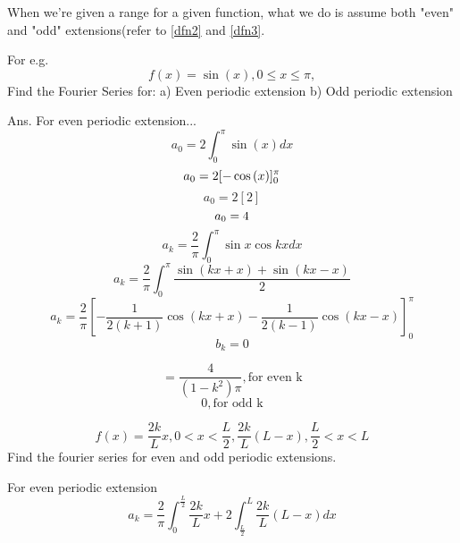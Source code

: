 \documentclass[twoside]{report}
\begin{document}
When we're given a range for a given function, what we do is assume both "even" and "odd" extensions(refer to \ref{dfn2} and \ref{dfn3}.

For e.g.
$$
f(x) = \sin{(x)}, 0\leq x\leq\pi,$$
Find the Fourier Series for:
a) Even periodic extension 
b) Odd periodic extension

Ans.
For even periodic extension...
\begin{displaymath}
    a_0 = 2\int_{0}^{\pi} \sin{(x)}dx    
\end{displaymath}
\begin{displaymath}
    a_0 = 2 [-\cos{(x)}]_0^{\pi} \\
    \end{displaymath}
    \begin{displaymath}
        a_0 = 2 [2]
    \end{displaymath}
    \begin{displaymath}
        a_0 = 4 \\
    \end{displaymath}
    \begin{displaymath}
        a_k = \frac{2}{\pi}\int_0^{\pi} \sin{x} \cos{kx} dx
    \end{displaymath}
    \begin{displaymath}
        a_k = \frac{2}{\pi} \int_0^{\pi} \frac{\sin{(kx + x)} + \sin{(kx-x)}}{2}
    \end{displaymath}
    \begin{displaymath}
        a_k = \frac{2}{\pi} [-\frac{1}{2(k+1)}\cos{(kx+x)} - \frac{1}{2(k-1)}\cos{(kx-x)}]_0^\pi
    \end{displaymath}
    \begin{displaymath}
        b_k = 0
    \end{displaymath}

\begin{displaymath}
   = \frac{4}{(1-k^2)\pi}, \text{for even k}
\end{displaymath}
\begin{displaymath}
   0, \text{for odd k}
\end{displaymath}

\begin{question}
   \[f(x) = \frac{2k}{L} x, 0 < x < \frac{L}{2}, \frac{2k}{L}(L-x), \frac{L}{2}<x<L\]
    Find the fourier series for even and odd periodic extensions.
\end{question}
\begin{solution}
   For even periodic extension
   \[
      a_k = \frac{2}{\pi} \int_0^{\frac{L}{2}} \frac{2k}{L} x + 2 \int_{\frac{L}{2}}^{L} \frac{2k}{L}(L-x)dx
   \]
\end{solution}
\pagebreak
\end{document}
